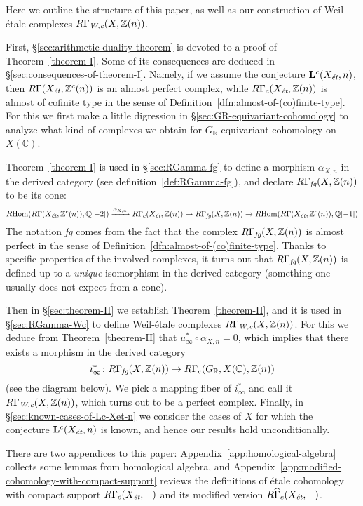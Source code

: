 \documentclass{article}
\DeclareMathOperator{\Hom}{Hom}
\newcommand{\CC}{\mathbb{C}}
\newcommand{\QQ}{\mathbb{Q}}
\newcommand{\RR}{\mathbb{R}}
\newcommand{\ZZ}{\mathbb{Z}}
\newcommand{\et}{\text{\it ét}}
\newcommand{\fg}{\text{\it fg}}
\newcommand{\Wc}{\text{\it W,c}}
\newcommand{\RHom}{R\!\Hom}
\theoremstyle{definition}
\numberwithin{equation}{section}
\begin{document}
Here we outline the structure of this paper, as well as our construction of
Weil-étale complexes $R\Gamma_\Wc (X, \ZZ (n))$.

First, \S\ref{sec:arithmetic-duality-theorem} is devoted to a proof of
Theorem~\ref{theorem-I}. Some of its consequences are deduced in
\S\ref{sec:consequences-of-theorem-I}. Namely, if we assume the conjecture
$\mathbf{L}^c (X_\et, n)$, then $R\Gamma (X_\et, \ZZ^c (n))$ is an almost
perfect complex, while $R\Gamma_c (X_\et, \ZZ (n))$ is almost of cofinite type
in the sense of Definition~\ref{dfn:almost-of-(co)finite-type}. For this we
first make a little digression in \S\ref{sec:GR-equivariant-cohomology} to
analyze what kind of complexes we obtain for $G_\RR$-equivariant cohomology on
$X (\CC)$.

Theorem~\ref{theorem-I} is used in \S\ref{sec:RGamma-fg} to define a morphism
$\alpha_{X,n}$ in the derived category (see definition~\ref{def:RGamma-fg}),
and declare $R\Gamma_\fg (X, \ZZ(n))$ to be its cone:
\[ \RHom (R\Gamma (X_\et, \ZZ^c (n)), \QQ [-2]) \xrightarrow{\alpha_{X,n}}
R\Gamma_c (X_\et, \ZZ (n)) \to
R\Gamma_\fg (X, \ZZ(n)) \to
\RHom (R\Gamma (X_\et, \ZZ^c (n)), \QQ [-1]) \]
The notation \emph{fg} comes from the fact that the complex
$R\Gamma_\fg (X, \ZZ(n))$ is almost perfect in the sense of
Definition~\ref{dfn:almost-of-(co)finite-type}. Thanks to specific properties
of the involved complexes, it turns out that $R\Gamma_\fg (X, \ZZ(n))$ is
defined up to a \emph{unique} isomorphism in the derived category (something one
usually does not expect from a cone).

Then in \S\ref{sec:theorem-II} we establish Theorem~\ref{theorem-II}, and it is
used in \S\ref{sec:RGamma-Wc} to define Weil-étale complexes
$R\Gamma_\Wc (X, \ZZ(n))$. For this we deduce from Theorem~\ref{theorem-II} that
$u_\infty^* \circ \alpha_{X,n} = 0$, which implies that there exists a morphism
in the derived category
$$i_\infty^*\colon R\Gamma_\fg (X, \ZZ (n)) \to R\Gamma_c (G_\RR, X (\CC), \ZZ(n))$$
(see the diagram below). We pick a mapping fiber of $i_\infty^*$ and call it
$R\Gamma_\Wc (X, \ZZ (n))$, which turns out to be a perfect complex.
Finally, in \S\ref{sec:known-cases-of-Lc-Xet-n} we consider the cases of $X$ for
which the conjecture $\mathbf{L}^c (X_\et, n)$ is known, and hence our results hold unconditionally.

There are two appendices to this paper: Appendix~\ref{app:homological-algebra}
collects some lemmas from homological algebra, and
Appendix~\ref{app:modified-cohomology-with-compact-support} reviews the
definitions of étale cohomology with compact support $R\Gamma_c (X_\et, -)$
and its modified version $R\widehat{\Gamma}_c (X_\et, -)$.
\end{document}
